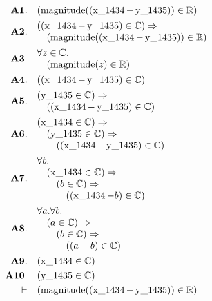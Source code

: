 \documentclass[11pt]{article}
\theoremstyle{plain}
\begin{document}
\begin{align*}
  \mathbf{A1.}\quad & (\operatorname{magnitude}((\operatorname{x\_1434} - \operatorname{y\_1435})) \in \mathbb{R}) \\
  \mathbf{A2.}\quad & \begin{array}{@{}l@{}} ((\operatorname{x\_1434} - \operatorname{y\_1435}) \in \mathbb{C}) \Rightarrow  \\ \quad (\operatorname{magnitude}((\operatorname{x\_1434} - \operatorname{y\_1435})) \in \mathbb{R}) \end{array} \\
  \mathbf{A3.}\quad & \begin{array}{@{}l@{}} \forall z \in \mathbb{C}. \\ \quad (\operatorname{magnitude}(z) \in \mathbb{R}) \end{array} \\
  \mathbf{A4.}\quad & ((\operatorname{x\_1434} - \operatorname{y\_1435}) \in \mathbb{C}) \\
  \mathbf{A5.}\quad & \begin{array}{@{}l@{}} (\operatorname{y\_1435} \in \mathbb{C}) \Rightarrow  \\ \quad ((\operatorname{x\_1434} - \operatorname{y\_1435}) \in \mathbb{C}) \end{array} \\
  \mathbf{A6.}\quad & \begin{array}{@{}l@{}} (\operatorname{x\_1434} \in \mathbb{C}) \Rightarrow  \\ \quad (\operatorname{y\_1435} \in \mathbb{C}) \Rightarrow  \\ \quad \quad ((\operatorname{x\_1434} - \operatorname{y\_1435}) \in \mathbb{C}) \end{array} \\
  \mathbf{A7.}\quad & \begin{array}{@{}l@{}} \forall b. \\ \quad (\operatorname{x\_1434} \in \mathbb{C}) \Rightarrow  \\ \quad \quad (b \in \mathbb{C}) \Rightarrow  \\ \quad \quad \quad ((\operatorname{x\_1434} - b) \in \mathbb{C}) \end{array} \\
  \mathbf{A8.}\quad & \begin{array}{@{}l@{}} \forall a. \forall b. \\ \quad (a \in \mathbb{C}) \Rightarrow  \\ \quad \quad (b \in \mathbb{C}) \Rightarrow  \\ \quad \quad \quad ((a - b) \in \mathbb{C}) \end{array} \\
  \mathbf{A9.}\quad & (\operatorname{x\_1434} \in \mathbb{C}) \\
  \mathbf{A10.}\quad & (\operatorname{y\_1435} \in \mathbb{C}) \\
  \vdash\quad & (\operatorname{magnitude}((\operatorname{x\_1434} - \operatorname{y\_1435})) \in \mathbb{R})
\end{align*}
\end{document}
